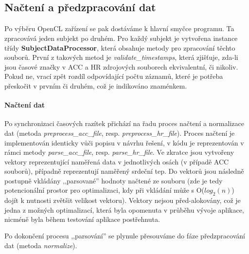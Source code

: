 \documentclass[12pt, a4paper]{article}
\begin{document}
\subsection{Načtení a předzpracování dat}
\paragraph{} Po výběru OpenCL zařízení se pak dostáváme k hlavní smyčce programu. 
Ta zpracovává jeden subjekt po druhém.
Pro každý subjekt je vytvořena instance třídy \textbf{SubjectDataProcessor}, která obsahuje metody pro zpracování těchto souborů.
První z takových metod je \textit{validate\_timestamps}, která zjišťuje, zda-li jsou časové značky v ACC a HR zdrojových souborech ekvivalentní, či nikoliv.
Pokud ne, vrací zpět rozdíl odpovídající počtu záznamů, které je potřeba přeskočit v prvním či druhém, což je indikováno znaménkem. 

\paragraph{Načtení dat} Po synchronizaci časových razítek přichází na řadu proces načtení a normalizace dat (metoda \textit{preprocess\_acc\_file}, resp. \textit{preprocess\_hr\_file}). 
Proces načtení je implementován identicky vůči popisu v návrhu řešení, v kódu je reprezentován v rámci metody \textit{parse\_acc\_file}, resp. \textit{parse\_hr\_file}.
Ve zkratce jsou vytvořeny vektory reprezentující naměřená data v jednotlivých osách (v případě ACC souborů), případně reprezentují naměřený srdeční tep.
Do vektorů jsou následně postupně vkládány ,,parsované'' hodnoty načtené ze souboru (zde je tedy potencionální prostor pro optimalizaci, kdy při vkládání může s O($log_{2}(n)$) dojít k nutnosti zvětšit velikost vektoru).
Vektory nejsou před-alokovány, což je jedna z možných optimalizací, která byla opomenuta v průběhu vývoje aplikace, nicméně byla během testování aplikace postřehnuta.

Po dokončení procesu ,,parsování'' se plynule přesouváme do fáze předzpracování dat (metoda \textit{normalize}).
\end{document}
